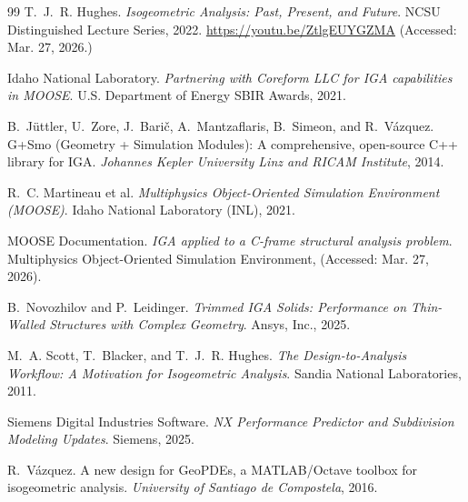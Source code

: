 \documentclass[12pt,report,justified]{SANDreport}
\begin{document}
\begin{thebibliography}{99}
T.~J.~R. Hughes.
\newblock \emph{Isogeometric Analysis: Past, Present, and Future}.
\newblock NCSU Distinguished Lecture Series, 2022. \url{https://youtu.be/ZtlgEUYGZMA} (Accessed: Mar. 27, 2026.)

Idaho National Laboratory.
\newblock \emph{Partnering with Coreform LLC for IGA capabilities in MOOSE}.
\newblock U.S. Department of Energy SBIR Awards, 2021. 

B.~Jüttler, U.~Zore, J.~Barič, A.~Mantzaflaris, B.~Simeon, and R.~Vázquez.
\newblock G+Smo (Geometry + Simulation Modules): A comprehensive, open-source C++ library for IGA.
\newblock \emph{Johannes Kepler University Linz and RICAM Institute}, 2014.

R.~C. Martineau et al.
\newblock \emph{Multiphysics Object-Oriented Simulation Environment (MOOSE)}.
\newblock Idaho National Laboratory (INL), 2021.

MOOSE Documentation.
\newblock \emph{IGA applied to a C-frame structural analysis problem}.
\newblock Multiphysics Object-Oriented Simulation Environment, (Accessed: Mar. 27, 2026).

B.~Novozhilov and P.~Leidinger.
\newblock \emph{Trimmed IGA Solids: Performance on Thin-Walled Structures with Complex Geometry}.
\newblock Ansys, Inc., 2025.

M.~A. Scott, T.~Blacker, and T.~J.~R. Hughes.
\newblock \emph{The Design-to-Analysis Workflow: A Motivation for Isogeometric Analysis}.
\newblock Sandia National Laboratories, 2011.

Siemens Digital Industries Software.
\newblock \emph{NX Performance Predictor and Subdivision Modeling Updates}.
\newblock Siemens, 2025.

R.~Vázquez.
\newblock A new design for GeoPDEs, a MATLAB/Octave toolbox for isogeometric analysis.
\newblock \emph{University of Santiago de Compostela}, 2016.

\end{thebibliography}
\end{document}
